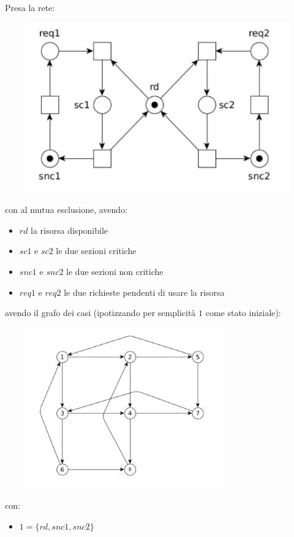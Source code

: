 \documentclass[a4paper,12pt, oneside]{book}
\begin{document}
\begin{esempio}
  Presa la rete:
  \begin{figure}[H]
    \centering
    \includegraphics[scale = 0.5]{img/mc.jpg}
  \end{figure}
  con al mutua esclusione, avendo:
  \begin{itemize}
    \item $rd$ la risorsa disponibile
    \item $sc1$ e $sc2$ le due sezioni critiche
    \item $snc1$ e $snc2$ le due sezioni non critiche
    \item $req1$ e $req2$ le due richieste pendenti di usare la risorsa
  \end{itemize}
  avendo il grafo dei casi (ipotizzando per semplicità $1$ come stato iniziale):
  \begin{figure}[H]
    \centering
    \includegraphics[scale = 0.7]{img/mc2.jpg}
  \end{figure}
  con:
  \begin{itemize}
    \item $1=\{rd,snc1,snc2\}$

\end{itemize}
\end{esempio}
\end{document}
